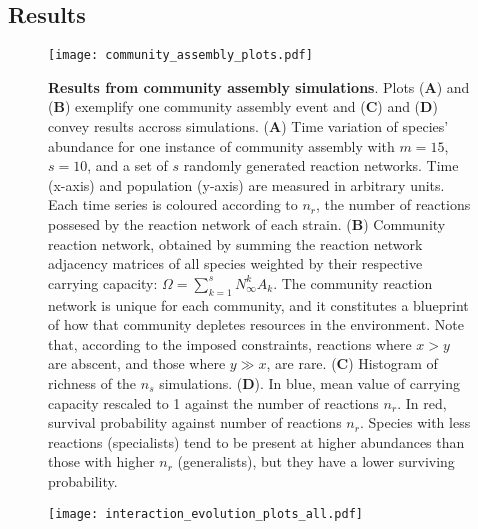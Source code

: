 \documentclass[titlepage,11pt]{article}
\begin{document}
\begin{linenumbers}
\begin{singlespace}
		\section{Results}
			\begin{figure}
				\centering			
				\texttt{[image: community\_assembly\_plots.pdf]}
				\caption{\textbf{Results from community assembly simulations}. Plots (\textbf{A}) and (\textbf{B}) exemplify one community assembly event and  (\textbf{C}) and (\textbf{D}) convey results accross simulations. (\textbf{A}) Time variation of species' abundance for one instance of community assembly with $ m = 15 $, $ s = 10 $, and a set of $ s $ randomly generated reaction networks. Time (x-axis) and population (y-axis) are measured in arbitrary units. Each time series is coloured according to $ n_r $, the number of reactions possesed by the reaction network of each strain. (\textbf{B}) Community reaction network, obtained by summing the reaction network adjacency matrices of all species weighted by their respective carrying capacity: $ \Omega = \sum_{k = 1}^{s} N^k_{\infty}A_k  $. The community reaction network is unique for each community, and it constitutes a blueprint of how that community depletes resources in the environment. Note that, according to the imposed constraints, reactions where $ x > y $ are abscent, and those where $ y \gg  x $, are rare. (\textbf{C}) Histogram of richness of the $ n_s $ simulations. (\textbf{D}). In blue, mean value of carrying capacity rescaled to 1 against the number of reactions $ n_r $. In red, survival probability against number of reactions $ n_r $. Species with less reactions (specialists) tend to be present at higher abundances than those with higher $ n_r $ (generalists), but they have a lower surviving probability.}
				\label{fig:community_assembly_results}
			\end{figure}
			\begin{figure}
			\centering			
			\texttt{[image: interaction\_evolution\_plots\_all.pdf]}

\end{figure}
\end{singlespace}
\end{linenumbers}
\end{document}
